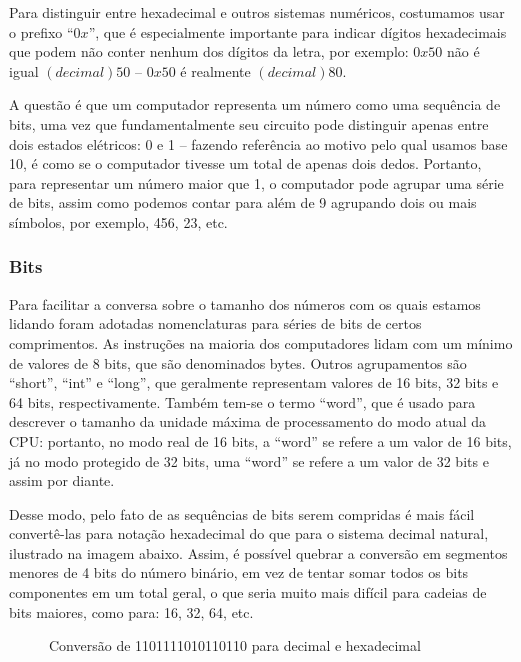 Para distinguir entre hexadecimal e outros sistemas numéricos, costumamos usar o prefixo ``$0x$'', que é especialmente importante para indicar dígitos hexadecimais que podem não conter nenhum dos dígitos da letra, por exemplo: $0x50$ não é igual $(decimal) 50$ – $0x50$ é realmente $(decimal) 80$.

A questão é que um computador representa um número como uma sequência de bits, uma vez que fundamentalmente seu circuito pode distinguir apenas entre dois estados elétricos: 0 e 1 – fazendo referência ao motivo pelo qual usamos base 10, é como se o computador tivesse um total de apenas dois dedos. Portanto, para representar um número maior que 1, o computador pode agrupar uma série de bits, assim como podemos contar para além de 9 agrupando dois ou mais símbolos, por exemplo, 456, 23, etc.

\subsubsection{Bits}

Para facilitar a conversa sobre o tamanho dos números com os quais estamos lidando foram adotadas nomenclaturas para séries de bits de certos comprimentos. As instruções na maioria dos computadores lidam com um mínimo de valores de 8 bits, que são denominados bytes. Outros agrupamentos são ``short'', ``int'' e ``long'', que geralmente representam valores de 16 bits, 32 bits e 64 bits, respectivamente. Também tem-se o termo ``word'', que é usado para descrever o tamanho da unidade máxima de processamento do modo atual da CPU: portanto, no modo real de 16 bits, a ``word'' se refere a um valor de 16 bits, já no modo protegido de 32 bits, uma ``word'' se refere a um valor de 32 bits e assim por diante.

Desse modo, pelo fato de as sequências de bits serem compridas é mais fácil convertê-las para notação hexadecimal do que para o sistema decimal natural, ilustrado na imagem abaixo. Assim, é possível quebrar a conversão em segmentos menores de 4 bits do número binário, em vez de tentar somar todos os bits componentes em um total geral, o que seria muito mais difícil para cadeias de bits maiores, como para: 16, 32, 64, etc. 

\vspace{1cm}
\begin{figure}[H] \centering 
  \caption{\label{binary_conversions} Conversão de 1101111010110110 para decimal e hexadecimal} 
\end{figure}


